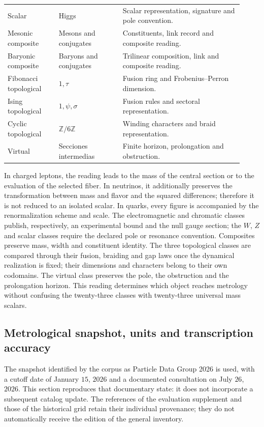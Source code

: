 \begin{longtable}{p{0.20\linewidth}p{0.25\linewidth}p{0.47\linewidth}}
Scalar & Higgs & Scalar representation, signature and pole convention.\\
Mesonic composite & Mesons and conjugates & Constituents, link record and composite reading.\\
Baryonic composite & Baryons and conjugates & Trilinear composition, link and composite reading.\\
Fibonacci topological & \(1,\tau\) & Fusion ring and Frobenius--Perron dimension.\\
Ising topological & \(1,\psi,\sigma\) & Fusion rules and sectoral representation.\\
Cyclic topological & \(\mathbb Z/6\mathbb Z\) & Winding characters and braid representation.\\
Virtual & Secciones intermedias & Finite horizon, prolongation and obstruction.\\
\end{longtable}
\endgroup

In charged leptons, the reading leads to the mass of the central section
or to the evaluation of the selected fiber. In neutrinos, it additionally preserves
the transformation between mass and flavor and the squared differences; therefore
it is not reduced to an isolated scalar. In quarks, every figure is accompanied by
the renormalization scheme and scale. The electromagnetic and
chromatic classes publish, respectively, an experimental bound and the null gauge
section; the \(W\), \(Z\) and scalar classes require the declared pole
or resonance convention. Composites preserve mass, width and constituent
identity. The three topological classes are compared through their
fusion, braiding and gap laws once the dynamical realization is fixed;
their dimensions and characters belong to their own codomains. The virtual
class preserves the pole, the obstruction and the prolongation horizon. This
reading determines which object reaches metrology without confusing the
twenty-three classes with twenty-three universal mass scalars.

\subsection{Metrological snapshot, units and transcription accuracy}
\label{vi:subsec:vi-corte-metrologico}

The snapshot identified by the corpus as Particle Data Group
2026 is used, with a cutoff date of January \(15\), \(2026\) and a documented
consultation on July \(26\), \(2026\). This section reproduces that
documentary state: it does not incorporate a subsequent catalog update.
The references of the evaluation supplement and those of the historical grid
retain their individual provenance; they do not automatically receive the edition
of the general inventory.

